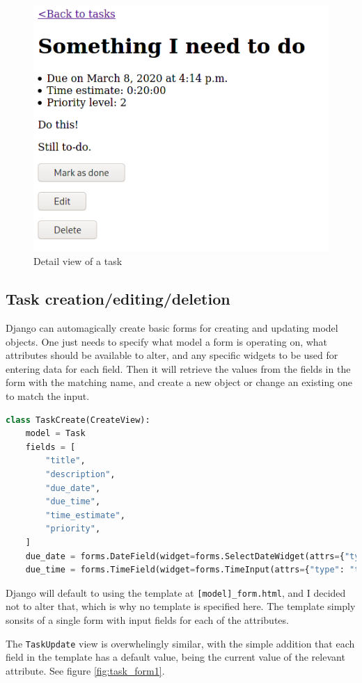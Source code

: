 \documentclass{article}
\begin{document}
\begin{figure}[H]
	\centering
	\includegraphics[width=0.6\linewidth]{Screenshots/task_detail.png}
	\caption{Detail view of a task}
	\label{fig:task_detail1}
\end{figure}

\subsection{Task creation/editing/deletion}
Django can automagically create basic forms for creating and updating model objects.
One just needs to specify what model a form is operating on,
what attributes should be available to alter,
and any specific widgets to be used for entering data for each field.
Then it will retrieve the values from the fields in the form with the matching name,
and create a new object or change an existing one to match the input.

\begin{lstlisting}[language=Python, breaklines]
class TaskCreate(CreateView):
    model = Task
    fields = [
        "title",
        "description",
        "due_date",
        "due_time",
        "time_estimate",
        "priority",
    ]
    due_date = forms.DateField(widget=forms.SelectDateWidget(attrs={"type": "date"}))
    due_time = forms.TimeField(widget=forms.TimeInput(attrs={"type": "time"}))
\end{lstlisting}

Django will default to using the template at \texttt{[model]\_form.html},
and I decided not to alter that,
which is why no template is specified here.
The template simply sonsits of a single form with input fields for each of the attributes.

The \texttt{TaskUpdate} view is overwhelingly similar,
with the simple addition that each field in the template has a default value,
being the current value of the relevant attribute.
See figure \ref{fig:task_form1}.
\end{document}
